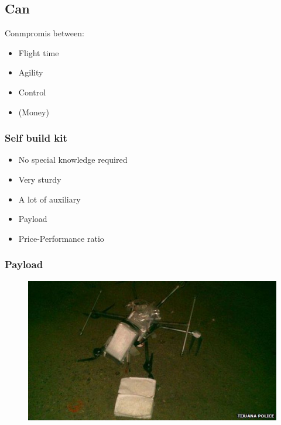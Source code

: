 \subsection{Can}


\begin{frame}
  Conmpromis between:
  \begin{itemize}
    \item Flight time
    \item Agility
    \item Control
	\item (Money)
		
  \end{itemize}
\end{frame}




\begin{frame}
\frametitle{Self build kit}

  \begin{itemize}
    \item No special knowledge required    
	\item Very sturdy
	\item A lot of auxiliary
	\item Payload    
	\item Price-Performance ratio
  \end{itemize}
  
\end{frame}



\begin{frame}
\frametitle{Payload}

  \begin{figure}
  \includegraphics[scale=0.6]{pic/03_our-copter/drug.jpg}
  \end{figure}
  
\end{frame}



